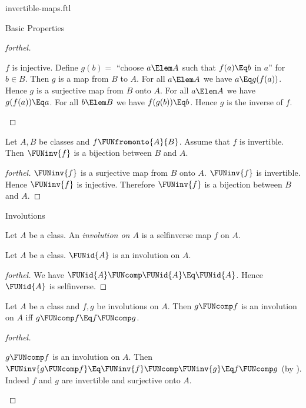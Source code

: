 \documentclass{stex}
\begin{document}
\begin{smodule}{invertible-maps.ftl}
\begin{sfragment}{Basic Properties}
\begin{proof}[forthel]
    \begin{case}{$f$ is injective.}
      Define $g(b) =$ ``choose $a \Elem A$ such that $f(a) \Eq b$ in $a$'' for
      $b \in B$.
      Then $g$ is a map from $B$ to $A$.
      For all $a \Elem A$ we have $a \Eq g(f(a))$.
      Hence $g$ is a surjective map from $B$ onto $A$.
      For all $a \Elem A$ we have $g(f(a)) \Eq a$.
      For all $b \Elem B$ we have $f(g(b)) \Eq b$.
      Hence $g$ is the inverse of $f$.
    \end{case}
  \end{proof}

  \begin{corollary}[forthel,id=FOUNDATIONS_09_5708971514003456]
    Let $A, B$ be classes and $f \FUNfromonto{A}{B}$.
    Assume that $f$ is invertible.
    Then $\FUNinv{f}$ is a bijection between $B$ and $A$.
  \end{corollary}
  \begin{proof}[forthel]
    $\FUNinv{f}$ is a surjective map from $B$ onto $A$.
    $\FUNinv{f}$ is invertible.
    Hence $\FUNinv{f}$ is injective.
    Therefore $\FUNinv{f}$ is a bijection between $B$ and $A$.
  \end{proof}
\end{sfragment}

\begin{sfragment}{Involutions}
  \begin{definition}[forthel,id=FOUNDATIONS_09_7282039688527872]
    Let $A$ be a class.
    An \emph{involution on $A$} is a selfinverse map $f$ on $A$.
  \end{definition}

  \begin{proposition}[forthel,id=FOUNDATIONS_09_7944474185433088]
    Let $A$ be a class.
    $\FUNid{A}$ is an involution on $A$.
  \end{proposition}
  \begin{proof}[forthel]
    We have $\FUNid{A} \FUNcomp \FUNid{A} \Eq \FUNid{A}$.
    Hence $\FUNid{A}$ is selfinverse.
  \end{proof}

  \begin{proposition}[forthel,id=FOUNDATIONS_09_6897019612299264]
    Let $A$ be a class and $f, g$ be involutions on $A$.
    Then $g \FUNcomp f$ is an involution on $A$ iff $g \FUNcomp f \Eq f \FUNcomp g$.
  \end{proposition}
  \begin{proof}[forthel]
    \begin{case}{$g \FUNcomp f$ is an involution on $A$.}
      Then $\FUNinv{g \FUNcomp f}
        \Eq \FUNinv{f} \FUNcomp \FUNinv{g}
        \Eq f \FUNcomp g$
      (by ).
      Indeed $f$ and $g$ are invertible and surjective onto $A$.
    \end{case}


\end{proof}
\end{sfragment}
\end{smodule}
\end{document}
